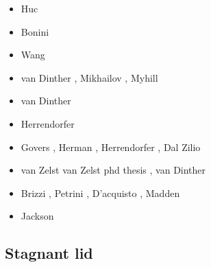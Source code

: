 \begin{scriptsize}
\begin{itemize}
\item[\nineteenninetyeight] Huc \etal \cite{huhc98}
\item[\twothousandthree] Bonini \etal \cite{bocs03}
\item[\twothousandtwelve] Wang \etal \cite{wahh12}
\item[\twothousandthirteen] van Dinther \etal \cite{vagd13a,vagd13b}, Mikhailov \cite{milp13},
                            Myhill \cite{myhi13}
\item[\twothousandfourteen] van Dinther \etal \cite{vamd14}
\item[\twothousandfifteen] Herrendorfer \etal \cite{hevg15}
\item[\twothousandeighteen] Govers \etal \cite{gofv18}, Herman \etal \cite{hefg18}, 
                            Herrendorfer \etal \cite{hegv18}, Dal Zilio \etal \cite{davg18}
\item[\twothousandnineteen] van Zelst \etal \cite{vawg19} van Zelst phd thesis \cite{vanzelst},
                            van Dinther \etal \cite{vakf19}
\item[\twothousandtwenty] Brizzi \etal \cite{brvf20}, Petrini \etal \cite{pegy20}, 
                          D'acquisto \etal \cite{dadm20}, Madden \etal \cite{mabb20} 
\item[\twothousandtwentyone] Jackson \etal \cite{jamp21}
\end{itemize}
\end{scriptsize}

\subsection{Stagnant lid} 

